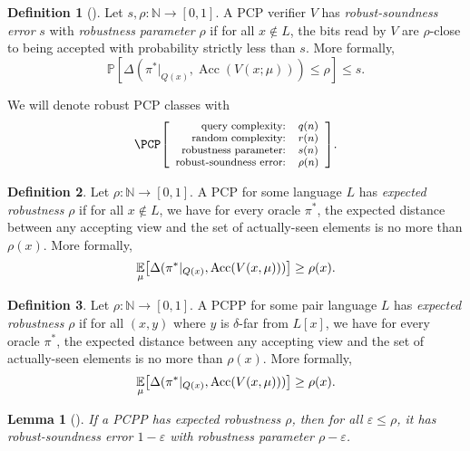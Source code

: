 \documentclass[english,12pt]{reedthesis}
\theoremstyle{plain}
\newtheorem{lemma}[lemma]{Lemma}
\theoremstyle{definition}
\newtheorem{defn}[defn]{Definition}
\theoremstyle{remark}
\DeclareMathOperator{\Acc}{Acc}
\newcommand{\pcpr}[4]{%
  \ensuremath%
  \mleft[{\footnotesize\begin{array}{r l}
    \text{query complexity:} & #1 \\
    \text{random complexity:} & #2 \\
    \text{robustness parameter:} & #3 \\
    \text{robust-soundness error:} & #4
  \end{array}}\mright]%
}
\begin{document}
\begin{defn}[{\cite[Def.\ 2.6]{BGHSV06}}]\label{def:robust-verifer}
  Let $s, \rho\colon \mathbb{N} \rightarrow [0, 1]$. A PCP verifier $V$ has
  \emph{robust-soundness error} $s$ with \emph{robustness parameter} $\rho$ if for
  all $x \notin L$, the bits read by $V$ are $\rho$-close to being accepted with
  probability strictly less than $s$. More formally,
  \begin{equation}
    \mathbb{P}[\Delta(\pi^{*}|_{Q(x)}, \Acc(V(x; \mu))) \le \rho] \le s.
  \end{equation}
\end{defn}

We will denote robust PCP classes with
\[
  \PCP\pcpr{q(n)}{r(n)}{s(n)}{\rho(n)}.
\]

\begin{defn}\label{def:exp-rob-pcp}
  Let $\rho: \mathbb{N} \rightarrow [0,1]$. A PCP for some language $L$ has \emph{expected
    robustness} $\rho$ if for all $x \notin L$, we have for every oracle $\pi^{*}$, the
  expected distance between any accepting view and the set of actually-seen
  elements is no more than $\rho(x)$. More formally,
  \begin{equation}
    \underset{\mu}{\mathbb{E}}\mleft[\Delta(\pi^{*}|_{Q(x)}, \Acc(V(x, \mu)))\mright] \ge \rho(x).
  \end{equation}
\end{defn}

\begin{defn}\label{def:exp-rob-pcpp}
  Let $\rho: \mathbb{N} \rightarrow [0,1]$. A PCPP for some pair language $L$ has \emph{expected
    robustness} $\rho$ if for all $(x, y)$ where $y$ is $\delta$-far from $L[x]$, we
  have for every oracle $\pi^{*}$, the expected distance between any accepting
  view and the set of actually-seen elements is no more than $\rho(x)$. More
  formally,
  \begin{equation}
    \underset{\mu}{\mathbb{E}}\mleft[\Delta(\pi^{*}|_{Q(x)}, \Acc(V(x, \mu)))\mright] \ge \rho(x).
  \end{equation}
\end{defn}

\begin{lemma}[{\cite[Proposition 2.10]{BGHSV06}}]\label{lem:exp-rob-to-rs}
  If a PCPP has expected robustness $\rho$, then for all $\varepsilon \le \rho$, it has
  robust-soundness error $1 - \varepsilon$ with robustness parameter $\rho - \varepsilon$.
\end{lemma}
\end{document}
